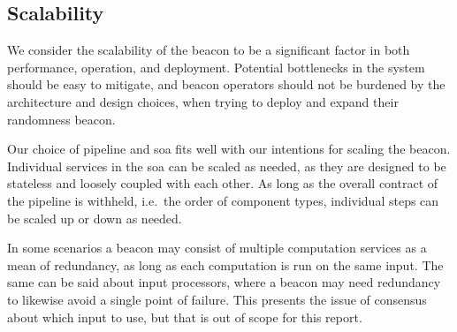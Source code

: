 \subsection{Scalability}

We consider the scalability of the beacon to be a significant factor in both performance, operation, and deployment.
Potential bottlenecks in the system should be easy to mitigate, and beacon operators should not be burdened by the architecture and design choices, when trying to deploy and expand their randomness beacon.

Our choice of pipeline and \gls{soa} fits well with our intentions for scaling the beacon.
Individual services in the \gls{soa} can be scaled as needed, as they are designed to be stateless and loosely coupled with each other.
As long as the overall contract of the pipeline is withheld, i.e.\ the order of component types, individual steps can be scaled up or down as needed.

In some scenarios a beacon may consist of multiple computation services as a mean of redundancy, as long as each computation is run on the same input.
The same can be said about input processors, where a beacon may need redundancy to likewise avoid a single point of failure.
This presents the issue of consensus about which input to use, but that is out of scope for this report.

